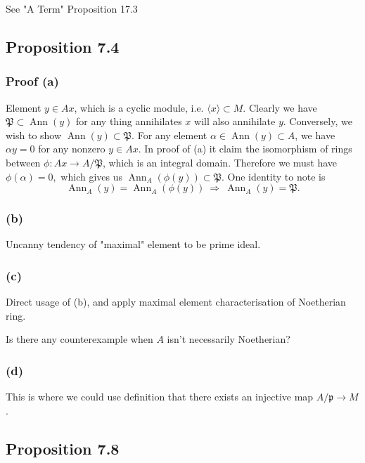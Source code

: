 See "A Term" \cite{altman} Proposition 17.3 

\subsection{Proposition 7.4}

\subsubsection{Proof (a)}
Element $y\in Ax$, which is a cyclic module, i.e. $\langle x\rangle\subset M$.
Clearly we have $\mathfrak P\subset \operatorname{Ann}(y)$ for any thing annihilates $x$ will also annihilate $y$. 
Conversely, we wish to show $\operatorname{Ann}(y)\subset \mathfrak P$. For any element $\alpha\in \operatorname{Ann}(y)\subset A$, we have $\alpha y=0$ for any nonzero $y\in Ax$. In proof of (a) it claim the isomorphism of rings between $\phi:Ax\to A/\mathfrak P$, which is an integral domain. Therefore we must have $\phi(\alpha)=0,$ which gives us $\operatorname{Ann}_A(\phi(y))\subset \mathfrak P$. One identity to note is 
$$\operatorname{Ann}_A(y)=\operatorname{Ann}_A(\phi(y)) ~\Rightarrow~ \operatorname{Ann}_A(y)=\mathfrak P.$$

\subsubsection{(b)}

Uncanny tendency of "maximal" element to be prime ideal.

\subsubsection{(c)}

Direct usage of (b), and apply maximal element characterisation of Noetherian ring.

Is there any counterexample when $A$ isn't necessarily Noetherian?

\subsubsection{(d)}

This is where we could use definition that there exists an injective map $A/\mathfrak p\to M$.

\subsection{Proposition 7.8}


